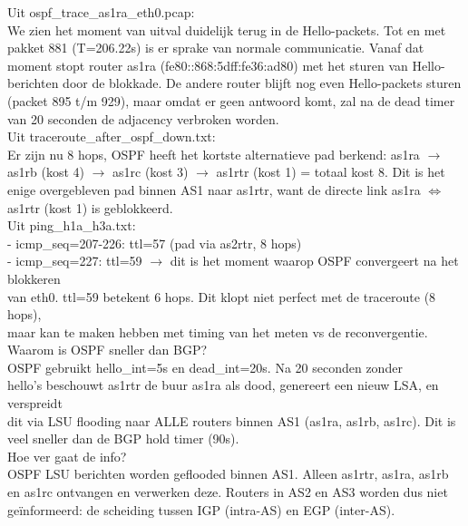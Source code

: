 Uit ospf\_trace\_as1ra\_eth0.pcap:\\
    We zien het moment van uitval duidelijk terug in de Hello-packets. Tot en met pakket 881 (T=206.22s) is er sprake van normale communicatie. Vanaf dat moment stopt router as1ra (fe80::868:5dff:fe36:ad80) met het sturen van Hello-berichten door de blokkade. De andere router blijft nog even Hello-packets sturen (packet 895 t/m 929), maar omdat er geen antwoord komt, zal na de dead timer van 20 seconden de adjacency verbroken worden.\\

Uit traceroute\_after\_ospf\_down.txt:\\
    Er zijn nu 8 hops, OSPF heeft het kortste alternatieve pad berkend:
    as1ra $\rightarrow$ as1rb (kost 4) $\rightarrow$ as1rc (kost 3) $\rightarrow$ as1rtr (kost 1) = totaal kost 8.
    Dit is het enige overgebleven pad binnen AS1 naar as1rtr, want de directe link
    as1ra $\Leftrightarrow$ as1rtr (kost 1) is geblokkeerd.\\

Uit ping\_h1a\_h3a.txt:\\
  - icmp\_seq=207-226: ttl=57 (pad via as2rtr, 8 hops)\\
  - icmp\_seq=227: ttl=59 $\rightarrow$ dit is het moment waarop OSPF convergeert na het blokkeren\\
    van eth0. ttl=59 betekent 6 hops. Dit klopt niet perfect met de traceroute (8 hops),\\
    maar kan te maken hebben met timing van het meten vs de reconvergentie.\\

Waarom is OSPF sneller dan BGP?\\

  OSPF gebruikt hello\_int=5s en dead\_int=20s. Na 20 seconden zonder\\
  hello's beschouwt as1rtr de buur as1ra als dood, genereert een nieuw LSA, en verspreidt\\
  dit via LSU flooding naar ALLE routers binnen AS1 (as1ra, as1rb, as1rc). Dit is veel sneller dan de BGP hold timer (90s).\\

Hoe ver gaat de info?\\

  OSPF LSU berichten worden geflooded binnen AS1. Alleen as1rtr, as1ra, as1rb en as1rc
  ontvangen en verwerken deze. Routers in AS2 en AS3 worden dus niet geïnformeerd: de scheiding tussen IGP (intra-AS) en EGP (inter-AS). \\ 


